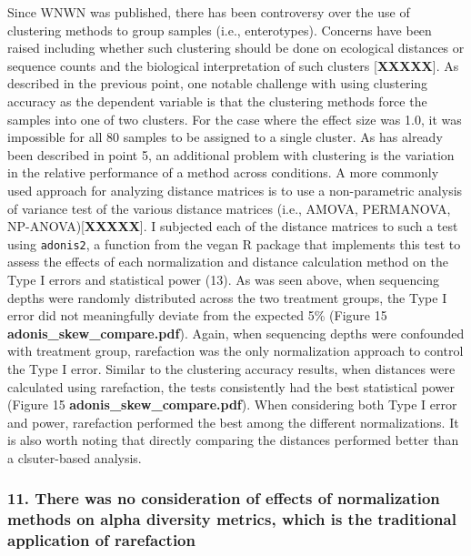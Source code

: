 \documentclass[
]{article}
\begin{document}
Since WNWN was published, there has been controversy over the use of
clustering methods to group samples (i.e., enterotypes). Concerns have
been raised including whether such clustering should be done on
ecological distances or sequence counts and the biological
interpretation of such clusters {[}\textbf{XXXXX}{]}. As described in
the previous point, one notable challenge with using clustering accuracy
as the dependent variable is that the clustering methods force the
samples into one of two clusters. For the case where the effect size was
1.0, it was impossible for all 80 samples to be assigned to a single
cluster. As has already been described in point 5, an additional problem
with clustering is the variation in the relative performance of a method
across conditions. A more commonly used approach for analyzing distance
matrices is to use a non-parametric analysis of variance test of the
various distance matrices (i.e., AMOVA, PERMANOVA,
NP-ANOVA){[}\textbf{XXXXX}{]}. I subjected each of the distance matrices
to such a test using \texttt{adonis2}, a function from the vegan R
package that implements this test to assess the effects of each
normalization and distance calculation method on the Type I errors and
statistical power (13). As was seen above, when sequencing depths were
randomly distributed across the two treatment groups, the Type I error
did not meaningfully deviate from the expected 5\% (Figure 15
\textbf{adonis\_skew\_compare.pdf}). Again, when sequencing depths were
confounded with treatment group, rarefaction was the only normalization
approach to control the Type I error. Similar to the clustering accuracy
results, when distances were calculated using rarefaction, the tests
consistently had the best statistical power (Figure 15
\textbf{adonis\_skew\_compare.pdf}). When considering both Type I error
and power, rarefaction performed the best among the different
normalizations. It is also worth noting that directly comparing the
distances performed better than a clsuter-based analysis.

\hypertarget{there-was-no-consideration-of-effects-of-normalization-methods-on-alpha-diversity-metrics-which-is-the-traditional-application-of-rarefaction}{%
\subsubsection{11. There was no consideration of effects of
normalization methods on alpha diversity metrics, which is the
traditional application of
rarefaction}\label{there-was-no-consideration-of-effects-of-normalization-methods-on-alpha-diversity-metrics-which-is-the-traditional-application-of-rarefaction}}
\end{document}
